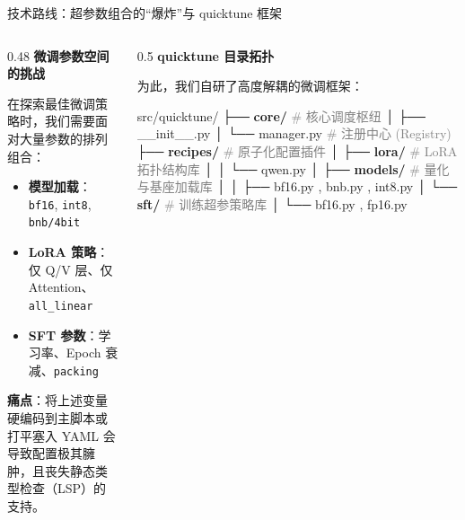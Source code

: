 \documentclass[aspectratio=169]{beamer}
\providecommand{\paragraph}[1]{\smallskip\textbf{#1}\par}
\begin{document}
\begin{frame}[fragile]{技术路线：超参数组合的“爆炸”与 quicktune 框架}
  \begin{columns}[T]
    \begin{column}{0.48\textwidth}
      \paragraph{微调参数空间的挑战}
      在探索最佳微调策略时，我们需要面对大量参数的排列组合：
      \begin{itemize}
        \item \textbf{模型加载}：\texttt{bf16}, \texttt{int8}, \texttt{bnb/4bit}
        \item \textbf{LoRA 策略}：仅 Q/V 层、仅 Attention、\texttt{all\_linear}
        \item \textbf{SFT 参数}：学习率、Epoch 衰减、\texttt{packing}
      \end{itemize}
      \vspace{0.2cm}
      \alert{\textbf{痛点}}：将上述变量硬编码到主脚本或打平塞入 YAML 会导致配置极其臃肿，且丧失静态类型检查（LSP）的支持。
    \end{column}
    
    \begin{column}{0.5\textwidth}
      \paragraph{quicktune 目录拓扑}
      为此，我们自研了高度解耦的微调框架：
\begin{semiverbatim}
\scriptsize
src/quicktune/
├── \textbf{core/}              \textcolor{gray}{# 核心调度枢纽}
│   ├── __init__.py
│   └── \alert{manager.py}     \textcolor{gray}{# 注册中心 (Registry)}
├── \textbf{recipes/}           \textcolor{gray}{# 原子化配置插件}
│   ├── \textbf{lora/}         \textcolor{gray}{# LoRA 拓扑结构库}
│   │   └── qwen.py
│   ├── \textbf{models/}       \textcolor{gray}{# 量化与基座加载库}
│   │   ├── bf16.py , bnb.py , int8.py
│   └── \textbf{sft/}          \textcolor{gray}{# 训练超参策略库}
│       └── bf16.py , fp16.py
\end{semiverbatim}
    \end{column}
  \end{columns}
\end{frame}
\end{document}
